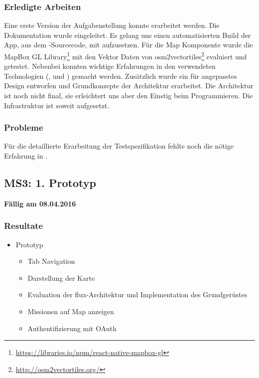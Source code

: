 \subsubsection{Erledigte Arbeiten}
Eine erste Version der Aufgabenstellung konnte erarbeitet werden. 
Die Dokumentation wurde eingeleitet.
Es gelang uns einen automatisierten Build der App, aus dem -Sourcecode, mit  aufzusetzen.
Für die Map Komponente wurde die MapBox GL Library\footnote{\url{https://libraries.io/npm/react-native-mapbox-gl}} mit den Vektor Daten von osm2vectortiles\footnote{\url{http://osm2vectortiles.org/}} evaluiert und getestet.
Nebenbei konnten wichtige Erfahrungen in den verwendeten Technologien (,  und ) gemacht werden.
Zusätzlich wurde ein für  angepasstes Design entworfen und Grundkonzepte der Architektur erarbeitet.
Die Architektur ist noch nicht final, sie erleichtert uns aber den Einstig beim Programmieren.
Die Infrastruktur ist soweit aufgesetzt.

\subsubsection{Probleme}
Für die detaillierte Erarbeitung der Testspezifikation fehlte noch die nötige Erfahrung in .


\subsection{MS3: 1. Prototyp}
\label{pm-ms3}
\textbf{Fällig am 08.04.2016}
\subsubsection{Resultate}
\begin{itemize}
	\item {} Prototyp
	\begin{itemize}
		\item Tab Navigation
		\item Darstellung der Karte
		\item Evaluation der flux-Architektur und Implementation des Grundgerüstes
		\item Missionen auf Map anzeigen
		\item Authentifizierung mit OAuth
	\end{itemize}
\end{itemize}

